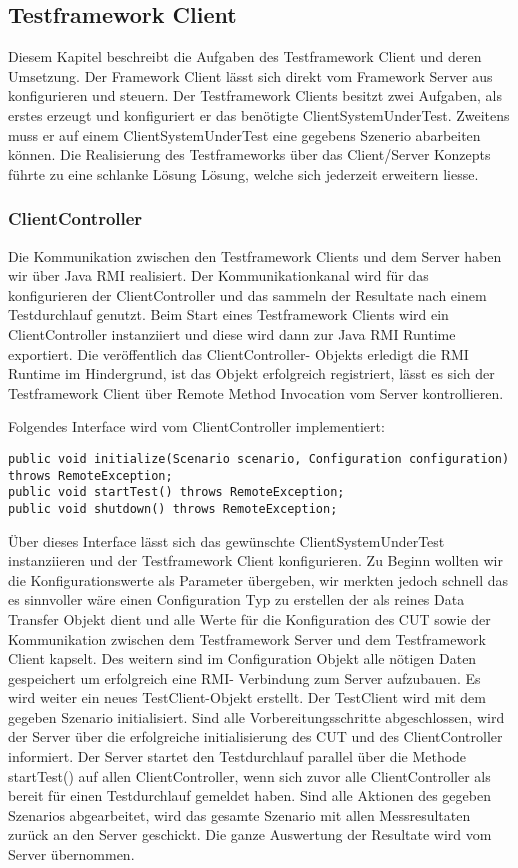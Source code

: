 \subsection{Testframework Client}
\label{sec:test-FW Client}
Diesem Kapitel beschreibt die Aufgaben des Testframework Client und deren Umsetzung. Der Framework Client lässt sich direkt vom Framework Server aus konfigurieren und steuern. Der Testframework Clients besitzt zwei Aufgaben, als erstes erzeugt und konfiguriert er das benötigte ClientSystemUnderTest. Zweitens muss er auf einem ClientSystemUnderTest eine gegebens Szenerio abarbeiten können. Die Realisierung des Testframeworks über das Client/Server Konzepts führte zu eine schlanke Lösung Lösung, welche sich jederzeit erweitern liesse.


\subsubsection{ClientController}
\label{sec:clientController}
Die Kommunikation zwischen den Testframework Clients und dem Server haben wir über Java RMI realisiert. Der Kommunikationkanal wird für das konfigurieren der ClientController und das sammeln der Resultate nach einem Testdurchlauf genutzt. Beim Start eines Testframework Clients wird ein ClientController instanziiert und diese wird dann zur Java RMI Runtime exportiert. Die veröffentlich das ClientController- Objekts erledigt die RMI Runtime im Hindergrund, ist das Objekt erfolgreich registriert, lässt es sich der Testframework Client über Remote Method Invocation vom Server kontrollieren.


Folgendes Interface wird vom ClientController implementiert:
\begin{lstlisting}	
public void initialize(Scenario scenario, Configuration configuration) throws RemoteException;
public void startTest() throws RemoteException;
public void shutdown() throws RemoteException;
\end{lstlisting}
Über dieses Interface lässt sich das gewünschte ClientSystemUnderTest instanziieren und der Testframework Client konfigurieren. Zu Beginn wollten wir die Konfigurationswerte als Parameter übergeben, wir merkten jedoch schnell das es sinnvoller wäre einen Configuration Typ zu erstellen der als reines Data Transfer Objekt dient und alle Werte für die Konfiguration des CUT sowie der Kommunikation zwischen dem Testframework Server und dem Testframework Client kapselt. Des weitern sind im Configuration Objekt alle nötigen Daten gespeichert um erfolgreich eine RMI- Verbindung zum Server aufzubauen. Es wird weiter ein neues TestClient-Objekt erstellt. Der TestClient wird mit dem gegeben Szenario initialisiert. Sind alle Vorbereitungsschritte abgeschlossen, wird der Server über die erfolgreiche initialisierung des CUT und des ClientController informiert. Der Server startet den Testdurchlauf parallel über die Methode startTest() auf allen ClientController, wenn sich zuvor alle ClientController als bereit für einen Testdurchlauf gemeldet haben. Sind alle Aktionen des gegeben Szenarios abgearbeitet, wird das gesamte Szenario mit allen Messresultaten zurück an den Server geschickt. Die ganze Auswertung der Resultate wird vom Server übernommen. 

